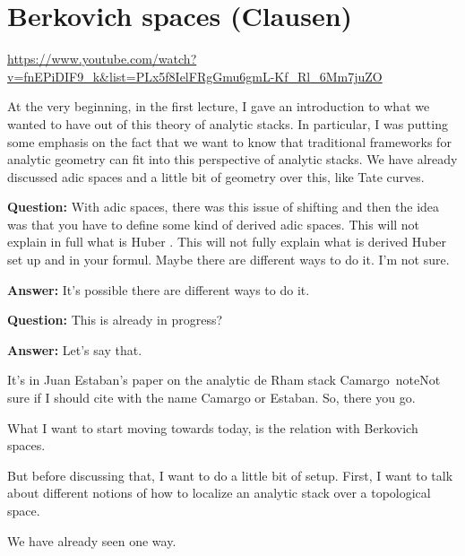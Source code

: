 
\section{\ufs Berkovich spaces (Clausen)}

\url{https://www.youtube.com/watch?v=fnEPiDIF9_k&list=PLx5f8IelFRgGmu6gmL-Kf_Rl_6Mm7juZO}
\renewcommand{\yt}[2]{\href{https://www.youtube.com/watch?v=fnEPiDIF9_k&list=PLx5f8IelFRgGmu6gmL-Kf_Rl_6Mm7juZO&t=#1}{#2}}
\vspace{1em}

At the very beginning, in the first lecture, I gave an introduction to what we wanted to have out of this theory of analytic stacks.
In particular, I was putting some emphasis on the fact that we want to know that traditional frameworks for analytic geometry can fit into this perspective of analytic stacks.
We have already discussed adic spaces and a little bit of geometry over this, like Tate curves. 

\textbf{Question:} With adic spaces, there was this issue of shifting and then the idea was that you have to define some kind of derived adic spaces. This will not explain in full what is Huber . This will not fully explain what is derived Huber  set up and in your formul. 
Maybe there are different ways to do it. I'm not sure.

\textbf{Answer:} It's possible there are different ways to do it. 

\textbf{Question:} This is already in progress?

\textbf{Answer:} Let's say that. 


It's in Juan Estaban's paper on the analytic de Rham stack Camargo \cite{AnalyticRhamStackRigid} \,note{Not sure if I should cite with the name Camargo or Estaban}. So, there you go. 

What I want to start moving towards today, is the relation with Berkovich spaces.

But before discussing that, I want to do a little bit of setup.
First, I want to talk about different notions of how to localize an analytic stack over a topological space. 

We have already seen one way. 

